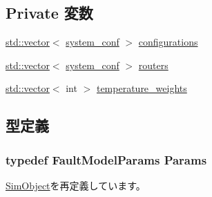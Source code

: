 \subsection*{Private 変数}
\begin{DoxyCompactItemize}
\item 
\hyperlink{classstd_1_1vector}{std::vector}$<$ \hyperlink{structFaultModel_1_1system__conf}{system\_\-conf} $>$ \hyperlink{classFaultModel_aa04aa52748b59c0c6e94daec54d0b10e}{configurations}
\item 
\hyperlink{classstd_1_1vector}{std::vector}$<$ \hyperlink{structFaultModel_1_1system__conf}{system\_\-conf} $>$ \hyperlink{classFaultModel_a3f1d61888ea857f30c7c8767847c2483}{routers}
\item 
\hyperlink{classstd_1_1vector}{std::vector}$<$ int $>$ \hyperlink{classFaultModel_ada85c55ffa43379d698989a8ee5c0391}{temperature\_\-weights}
\end{DoxyCompactItemize}


\subsection{型定義}
\hypertarget{classFaultModel_a7375aa39205bda869bcfb089a9163679}{
\subsubsection[{Params}]{\setlength{\rightskip}{0pt plus 5cm}typedef FaultModelParams {\bf Params}}}
\label{classFaultModel_a7375aa39205bda869bcfb089a9163679}


\hyperlink{classSimObject_a0f0761d2db586a23bb2a2880b8f387bb}{SimObject}を再定義しています。

